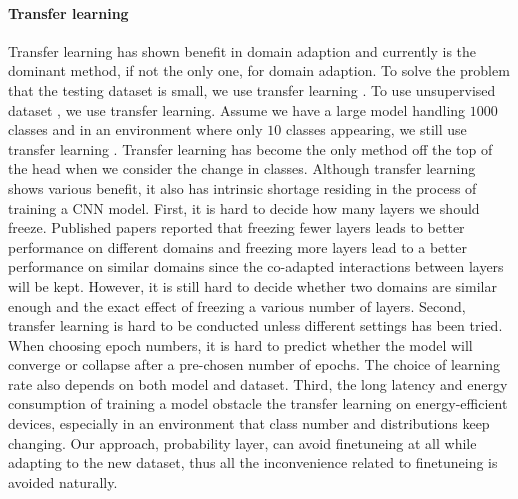 \documentclass[pageno]{jpaper}
\begin{document}
\paragraph{Transfer learning}
Transfer learning has shown benefit in domain adaption and currently is the dominant method, if not the only one, for domain adaption. To solve the problem that the testing dataset is small, we use transfer learning \cite{oquab2014learning}. To use unsupervised dataset \cite{doersch2015unsupervised, noroozi2016unsupervised}, we use transfer learning. Assume we have a large model handling $1000$ classes and in an environment where only $10$ classes appearing, we still use transfer learning \cite{han2016mcdnn, shen2016fast}. Transfer learning has become the only method off the top of the head when we consider the change in classes. Although transfer learning shows various benefit, it also has intrinsic shortage residing in the process of training a CNN model. First, it is hard to decide how many layers we should freeze. Published papers \cite{yosinski2014transferable} reported that freezing fewer layers leads to better performance on different domains and freezing more layers lead to a better performance on similar domains since the co-adapted interactions between layers will be kept. However, it is still hard to decide whether two domains are similar enough and the exact effect of freezing a various number of layers. Second, transfer learning is hard to be conducted unless different settings has been tried. When choosing epoch numbers, it is hard to predict whether the model will converge or collapse after a pre-chosen number of epochs. The choice of learning rate also depends on both model and dataset. Third, the long latency and energy consumption of training a model obstacle the transfer learning on energy-efficient devices, especially in an environment that class number and distributions keep changing. Our approach, probability layer, can avoid finetuneing at all while adapting to the new dataset, thus all the inconvenience related to finetuneing is avoided naturally.
\end{document}
